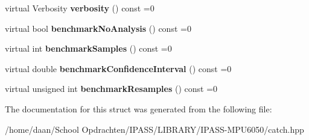 \begin{DoxyCompactItemize}
virtual Verbosity {\bfseries verbosity} () const =0
\item 
\mbox{\label{structCatch_1_1IConfig_aa9aa1eafdbe510e27bf319233969ee2c}} 
virtual bool {\bfseries benchmark\+No\+Analysis} () const =0
\item 
\mbox{\label{structCatch_1_1IConfig_a583734a61796b495b80779a6540eb6cc}} 
virtual int {\bfseries benchmark\+Samples} () const =0
\item 
\mbox{\label{structCatch_1_1IConfig_ae1ec73d460a2b58c7c9b022a430a34dd}} 
virtual double {\bfseries benchmark\+Confidence\+Interval} () const =0
\item 
\mbox{\label{structCatch_1_1IConfig_a3b8e5581be01f4773593f8b85eb7db98}} 
virtual unsigned int {\bfseries benchmark\+Resamples} () const =0
\end{DoxyCompactItemize}


The documentation for this struct was generated from the following file\+:\begin{DoxyCompactItemize}
\item 
/home/daan/\+School Opdrachten/\+I\+P\+A\+S\+S/\+L\+I\+B\+R\+A\+R\+Y/\+I\+P\+A\+S\+S-\/\+M\+P\+U6050/catch.\+hpp\end{DoxyCompactItemize}
